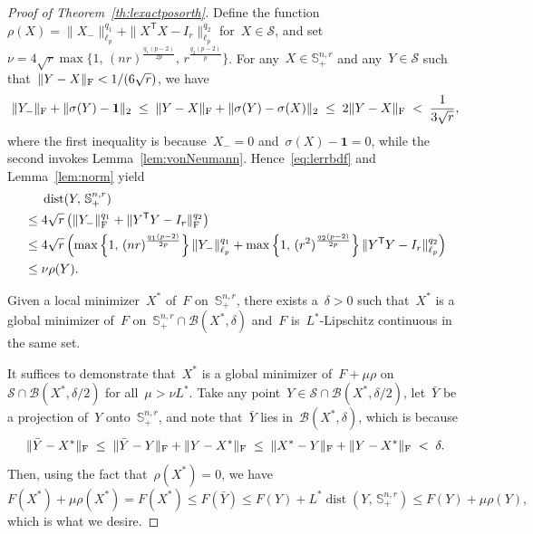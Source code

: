 \documentclass[11pt,a4paper]{article}  %
\theoremstyle{definition}
\DeclareMathOperator{\dist}{dist}
\newcommand{\BB}{\mathcal{B}}
\newcommand{\sset}{\mathcal{S}}
\newcommand{\res}{\rho}
\newcommand{\pen}{\res}
\newcommand{\penpar}{\mu}
\newcommand{\col}{r}
\newcommand{\stf}[1]{\mathbb{S}^{#1}}
\newcommand{\fro}{{\scriptstyle{\textnormal{F}}}}
\newcommand{\trs}{{\scriptstyle{\mathsf{T}}}}
\newcommand{\ones}{\mathbf{1}}
\begin{document}
\begin{proof}[Proof of Theorem~\ref{th:lexactposorth}]
    Define the function~$\pen(X) = \|X_{-}\|_{\ell_p}^{q_1} + \|X^\trs X -I_\col\|_{\ell_p}^{q_2}$
    for~$X\in\sset$,
     and set~$\nu= 4\sqrt{\col}\max\Big\{1, \, (n\col)^{\frac{q_1(p-2)} {2p}}\!, \, \col^{\frac{q_2(p-2)}{p}}\Big\}$.
    For any~$X\!\in\stf{n, \col}_+$ and any~$Y\!\in \sset$ such
    that~$\|Y - X\|_\fro < 1/(6\sqrt{\col})$, we have
    \begin{equation*}
        \|Y_{-}\|_\fro + \|\sigma(Y) - \ones\|_2
        \;\le\; \|Y-X\|_\fro + \|\sigma(Y) - \sigma(X)\|_2
        \;\le\; 2\|Y-X\|_\fro
        \;<\; \frac{1}{3\sqrt{\col}},
    \end{equation*}
    where the first inequality is because~$X_{-} = 0$ and~$\sigma(X) - \ones = 0$, while the second
    invokes Lemma~\ref{lem:vonNeumann}.
    Hence~\eqref{eq:lerrbdf} and Lemma~\ref{lem:norm} yield
    \begin{equation}
        \nonumber
        \begin{split}
        &\dist(Y,\, \stf{n, \col}_+)\\
        \;\le\; & 4\sqrt{\col} \left(\|Y_{-}\|_\fro^{q_1} + \|Y^\trs Y - I_\col\|_\fro^{q_2} \right)\\
        \;\le\; & 4 \sqrt{\col} \left(\max\left\{1,\,(n\col)^{\frac{q_1(p-2)}{2p}} \right\}\|Y_{-} \|_{\ell_p}^{q_1}
        + \max\left\{1,\,(\col^2)^{\frac{q_2(p-2)}{2p}} \right\} \|Y^\trs Y - I_\col\|_{\ell_p}^{q_2} \right)\\
                \;\le\; &\nu \pen(Y).
        \end{split}
    \end{equation}

    Given a local minimizer~$X^*$ of~$F$ on~$\stf{n, \col}_+$,
    there exists a~$\delta > 0$ such that~$X^*$ is a global minimizer
    of~$F$ on~$\stf{n, \col}_+\cap \BB(X^*, \delta)$
    and~$F$ is~$L^*$-Lipschitz continuous in the
    same set.

    It suffices to demonstrate that~$X^*$ is a global minimizer of~$F+\penpar\pen$
    on~$\sset\cap \BB(X^*, \delta/2)$
    for all~$\penpar > \nu L^*$.
    Take any point~$Y\in\sset\cap\BB(X^*,\delta/2)$,
    let~$\bar{Y}$ be a projection of~$Y$ onto~$\stf{n, \col}_+$, and
    note that~$\bar{Y}$ lies in~$\BB(X^*,\delta)$, which is because
    \begin{equation}
        \nonumber
        \|\bar{Y}-X^*\|_\fro \;\le\; \|\bar{Y} -Y\|_\fro + \|Y-X^*\|_\fro \;\le\; \|X^*-Y\|_\fro
        + \|Y-X^*\|_\fro \;<\; \delta.
    \end{equation}
    Then, using the fact that~$\pen(X^*) = 0$, we have
    \begin{equation*}
        \nonumber
        F(X^*) + \penpar \pen(X^*) = F(X^*)  \le F(\bar{Y}) \le F(Y) + L^* \dist(Y,\, \stf{n, \col}_+)
        \le F(Y) + \penpar \pen(Y),
    \end{equation*}
    which is what we desire.


\end{proof}
\end{document}
